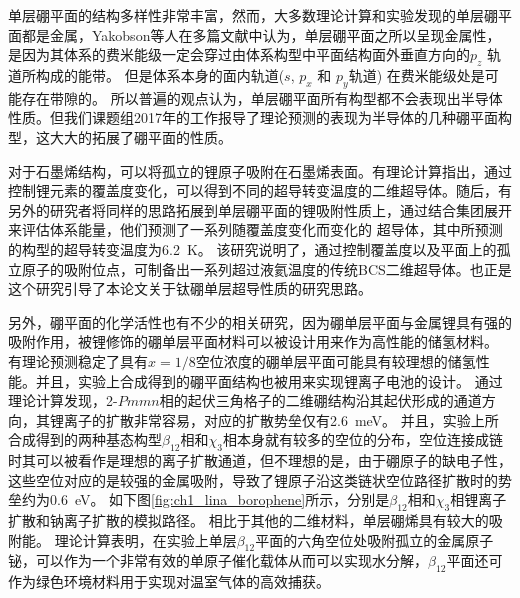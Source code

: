 单层硼平面的结构多样性非常丰富，然而，大多数理论计算和实验发现的单层硼平面都是金属\cite{zhang2017two}，Yakobson等人\cite{penev2012polymorphism,penev2016can}在多篇文献中认为，单层硼平面之所以呈现金属性，是因为其体系的费米能级一定会穿过由体系构型中平面结构面外垂直方向的$p_z$ 轨道所构成的能带。
但是体系本身的面内轨道($s$, $p_x$ 和 $p_y$轨道) 在费米能级处是可能存在带隙的。
所以普遍的观点认为，单层硼平面所有构型都不会表现出半导体性质。但我们课题组2017年的工作\cite{xu2017two}报导了理论预测的表现为半导体的几种硼平面构型，这大大的拓展了硼平面的性质。

对于石墨烯结构，可以将孤立的锂原子吸附在石墨烯表面。有理论计算指出\cite{profeta2012phonon}，通过控制锂元素的覆盖度变化，可以得到不同的超导转变温度的二维超导体。随后，有另外的研究者\cite{wu2016lithium}将同样的思路拓展到单层硼平面的锂吸附性质上，通过结合集团展开来评估体系能量，他们预测了一系列随覆盖度变化而变化的 超导体，其中所预测的构型的超导转变温度为\SI{6.2}{\kelvin}。 该研究说明了，通过控制覆盖度以及平面上的孤立原子的吸附位点，可制备出一系列超过液氦温度的传统BCS二维超导体。也正是这个研究引导了本论文关于钛硼单层超导性质的研究思路。

另外，硼平面的化学活性也有不少的相关研究，因为硼单层平面与金属锂具有强的吸附作用，被锂修饰的硼单层平面材料可以被设计用来作为高性能的储氢材料。
有理论\cite{li2015ultrahigh}预测稳定了具有$x=1/8$空位浓度的硼单层平面可能具有较理想的储氢性能。并且，实验上合成得到的硼平面结构也被用来实现锂离子电池的设计。
通过理论计算\cite{jiang2016borophene}发现，2-$Pmmn$相的起伏三角格子的二维硼结构沿其起伏形成的通道方向，其锂离子的扩散非常容易，对应的扩散势垒仅有\SI{2.6}{\meV}。
并且，实验上所合成得到的两种基态构型$\beta_{12}$相和$\chi_3$相本身就有较多的空位的分布，空位连接成链时其可以被看作是理想的离子扩散通道\cite{zhang2016borophene}，但不理想的是，由于硼原子的缺电子性，这些空位对应的是较强的金属吸附，导致了锂原子沿这类链状空位路径扩散时的势垒约为\SI{0.6}{\eV}。
如下图\ref{fig:ch1_lina_borophene}所示，分别是$\beta_{12}$相和$\chi_3$相锂离子扩散和钠离子扩散的模拟路径。
相比于其他的二维材料，单层硼烯具有较大的吸附能。
理论计算表明\cite{ling2017nanosheet}，在实验上单层$\beta_{12}$平面的六角空位处吸附孤立的金属原子铋，可以作为一个非常有效的单原子催化载体从而可以实现水分解，$\beta_{12}$平面还可作为绿色环境材料用于实现对温室气体的高效捕获\cite{tan2017borophene}。

